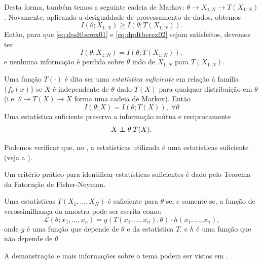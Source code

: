 \begin{example}
  Desta forma, também temos a seguinte cadeia de Markov: $\theta \rightarrow X_{1:N} \rightarrow T(X_{1:N})$.
  Novamente, aplicando a desigualdade de processamento de dados, obtemos
  \begin{equation}\label{eq:dpdtberex02}
    I(\theta;X_{1:N}) \geq I(\theta;T(X_{1:N})).
  \end{equation}
  Então, para que \ref{eq:dpdtberex01} e \ref{eq:dpdtberex02} sejam satisfeitos, devemos ter
  \begin{equation}
    I(\theta;X_{1:N}) = I(\theta;T(X_{1:N})) ,
  \end{equation}
  e nenhuma informação é perdida sobre $\theta$ indo de $X_{1:N}$ para $T(X_{1:N})$.
\end{example}





\begin{definition}
  Uma função $T(\cdot)$ é dita ser uma \emph{estatística suficiente} em relação à família
$\{f_{\theta} (x)\}$ se $X$ é independente de $\theta$ dado $T(X)$ para qualquer
distribuição em $\theta$ (i.e. $\theta \rightarrow T(X) \rightarrow X$ forma uma
cadeia de Markov). Então
\begin{equation}
I(\theta ; X) = I(\theta ; T(X)), \; \forall \theta
\end{equation}
Uma estatística suficiente preserva a informação mútua e reciprocamente
\begin{equation}
X \independent \theta | T(X) .
\end{equation}
\end{definition}

Podemos verificar que, no , a estatísticas utilizada
é uma estatísticas suficiente (veja a ).


Um critério prático para identificar estatísticas suficientes é dado pelo Teorema da Fatoração de Fisher-Neyman.
\begin{theorem}
Uma estatísticas $T(X_1,\ldots,X_N)$ é suficiente para $\theta$ se, e somente se,
a função de verossimilhança da amostra pode ser escrita como:
\begin{equation}
  \mathcal{L}(\theta;x_1,\ldots,x_n) = g(T(x_1,\ldots,x_n),\theta) \cdot h(x_1,\ldots,x_n) ,
\end{equation}
onde $g$ é uma função que depende de $\theta$ e da estatística $T$, e $h$ é uma função que não depende de $\theta$.
\end{theorem}
A demonstração e mais informações sobre o tema podem ser vistos em \textcite{berger2002}.





